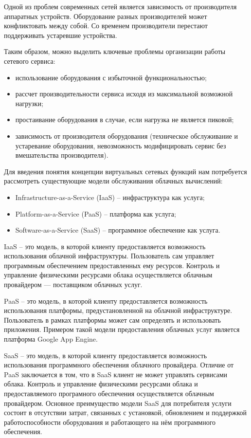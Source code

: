 \documentclass[oneside,final,14pt,a4paper]{extreport}
\begin{document}
Одной из проблем современных сетей является зависимость от производителя аппаратных устройств. Оборудование разных производителей может конфликтовать между собой. Со временем производители перестают поддерживать устаревшие устройства.

Таким образом, можно выделить ключевые проблемы организации работы сетевого сервиса:
\begin{itemize}
	\item использование оборудования с избыточной функциональностью;
	\item рассчет производительности сервиса исходя из максимальной возможной нагрузки;
	\item простаивание оборудования в случае, если нагрузка не является пиковой;
	\item зависимость от производителя оборудования (техническое обслуживание и устаревание оборудования, невозможность модифицировать сервис без вмешательства производителя).
\end{itemize}

Для введения понятия концепции виртуальных сетевых функций нам потребуется рассмотреть существующие модели обслуживания облачных вычислений: 
\begin{itemize}
	\item Infrastructure-as-a-Service (IaaS) -- инфраструктура как услуга;
	\item Platform-as-a-Service (PaaS) --  платформа как услуга;
	\item Software-as-a-Service (SaaS) -- программное обеспечение как услуга.
\end{itemize}

IaaS -- это модель, в которой клиенту предоставляется возможность использования облачной инфраструктуры. Пользователь сам управляет программным обеспечением предоставленных ему ресурсов. Контроль и управление физическими ресурсами облака осуществляется облачным провайдером --- поставщиком облачных услуг.

PaaS -- это модель, в которой клиенту предоставляется возможность использования платформы, предустановленной на облачной инфраструктуре. Пользователь в рамках платформы может сам определять и использовать приложения. Примером такой модели предоставления облачных услуг является платформа Google App Engine.\cite{bib:google-app-engine}

SaaS -- это модель, в которой клиенту предоставляется возможность использования программного обеспечения облачного провайдера. Отличие от PaaS заключается в том, что в SaaS клиент не может управлять сервисами облака.  Контроль и управление физическими ресурсами облака и предоставляемого програмного обеспечения осуществляется облачным провайдером. Основное преимущество модели SaaS для потребителя услуги состоит в отсутствии затрат, связанных с установкой, обновлением и поддержкой работоспособности оборудования и работающего на нём программного обеспечения.~\cite{bib:saas}
\end{document}
